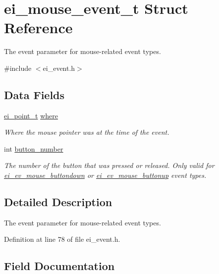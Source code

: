 \hypertarget{structei__mouse__event__t}{}\section{ei\+\_\+mouse\+\_\+event\+\_\+t Struct Reference}
\label{structei__mouse__event__t}


The event parameter for mouse-\/related event types.  




{\ttfamily \#include $<$ei\+\_\+event.\+h$>$}

\subsection*{Data Fields}
\begin{DoxyCompactItemize}
\item 
\hyperlink{structei__point__t}{ei\+\_\+point\+\_\+t} \hyperlink{structei__mouse__event__t_ac50f216f7af2a99469bd39cebc309af5}{where}
\begin{DoxyCompactList}\small\item\em Where the mouse pointer was at the time of the event. \end{DoxyCompactList}\item 
int \hyperlink{structei__mouse__event__t_a3165d2e07c861aa9ccb114a10a6b0afb}{button\+\_\+number}
\begin{DoxyCompactList}\small\item\em The number of the button that was pressed or released. Only valid for \hyperlink{ei__event_8h_a132dde064150d861ad24e9d839cbe007ae75b2b6a8423d54c46a418d222e0af66}{ei\+\_\+ev\+\_\+mouse\+\_\+buttondown} or \hyperlink{ei__event_8h_a132dde064150d861ad24e9d839cbe007aabd9931e36fb3628cc044a2aafc2c7e4}{ei\+\_\+ev\+\_\+mouse\+\_\+buttonup} event types. \end{DoxyCompactList}\end{DoxyCompactItemize}


\subsection{Detailed Description}
The event parameter for mouse-\/related event types. 

Definition at line 78 of file ei\+\_\+event.\+h.



\subsection{Field Documentation}
\mbox{\label{structei__mouse__event__t_a3165d2e07c861aa9ccb114a10a6b0afb}} 
